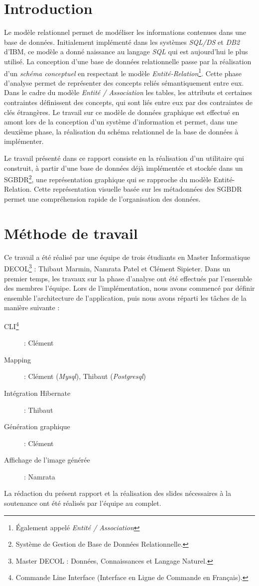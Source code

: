 \chapter*{Introduction}
Le modèle relationnel permet de modéliser les informations contenues dans une base de données. Initialement implémenté dans les systèmes \emph{SQL/DS} et \emph{DB2} d'IBM, ce modèle a donné naissance au langage \emph{SQL} qui est aujourd'hui le plus utilisé. La conception d'une base de données relationnelle passe par la réalisation d'un \emph{schéma conceptuel} en respectant le modèle  \emph{Entité-Relation}\footnote{Également appelé \emph{Entité / Association}}. Cette phase d'analyse permet de représenter des concepts reliés sémantiquement entre eux. Dans le cadre du modèle \emph{Entité / Association} les tables, les attributs et certaines contraintes définissent des concepts, qui sont liés entre eux par des contraintes de clés étrangères. Le travail sur ce modèle de données graphique est effectué en amont lors de la conception d'un système d'information et permet, dans une deuxième phase, la réalisation du schéma relationnel de la base de données à implémenter.

Le travail présenté dans ce rapport consiste en la réalisation d'un utilitaire qui construit, à partir d'une base de données déjà implémentée et stockée dans un SGBDR\footnote{Système de Gestion de Base de Données Relationnelle.}, une représentation graphique qui se rapproche du modèle Entité-Relation. Cette représentation visuelle basée sur les métadonnées des SGBDR permet une compréhension rapide de l'organisation des données.

\clearemptydoublepage
\chapter*{Méthode de travail}
Ce travail a été réalisé par une équipe de trois étudiants en Master Informatique DECOL\footnote{Master DECOL : Données, Connaissances et Langage Naturel.} : Thibaut Marmin, Namrata Patel et Clément Sipieter. Dans un premier temps, les travaux sur la phase d'analyse ont été effectués par l'ensemble des membres l'équipe. Lors de l'implémentation, nous avons commencé par définir ensemble l'architecture de l'application, puis nous avons réparti les tâches de la manière suivante : 

\begin{description}
\item[CLI\footnote{Commande Line Interface (\og Interface en Ligne de Commande \fg{} en Français).}] : Clément
\item[Mapping] : Clément (\emph{Mysql}), Thibaut (\emph{Postgresql})
\item[Intégration Hibernate] : Thibaut
\item[Génération graphique] : Clément
\item[Affichage de l'image générée] : Namrata
\end{description}

La rédaction du présent rapport et la réalisation des slides nécessaires à la soutenance ont été réalisés par l'équipe au complet.
